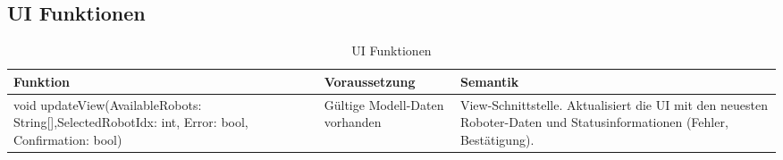 \subsection{UI Funktionen}
\begin{table}[h!]
    \centering
    \begin{tabular}{|p{5cm}|p{5cm}|p{5cm}|}
        \hline
        \textbf{Funktion} & \textbf{Voraussetzung} & \textbf{Semantik} \\
        \hline
        void updateView(AvailableRobots: String[],SelectedRobotIdx: int, Error: bool, Confirmation: bool) & Gültige Modell-Daten vorhanden & View-Schnittstelle. Aktualisiert die UI mit den neuesten Roboter-Daten und Statusinformationen (Fehler, Bestätigung). \\ 
        \hline
    \end{tabular}
    \caption{UI Funktionen}
    \label{tab:UIFunktionen}
\end{table}
\clearpage



